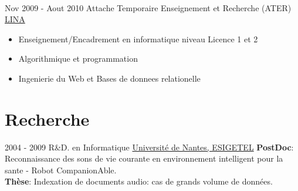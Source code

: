 \documentclass[letterpaper]{twentysecondcv} %
\begin{document}
\begin{twenty}
       \\
	\twentyitem
	{Nov 2009 -}
	{Aout 2010}
	{Attache Temporaire Enseignement et Recherche (ATER)}
	{\href{http://www.lina.univ-nantes.fr/}{LINA}}
	{}
	{
		\begin{itemize}
			\item Enseignement/Encadrement en informatique niveau Licence 1 et 2
			\item Algorithmique et programmation
			\item Ingenierie du Web et Bases de donnees relationelle
		\end{itemize}
	}
\end{twenty}

\section{Recherche}
\begin{twenty}
	\twentyitem
    	{2004 - 2009}
		{}
        {R\&D. en Informatique}
        {\href{https://www.univ-nantes.fr/}{Université de Nantes, ESIGETEL}}
        {}
	       {
	        \textbf{PostDoc}: Reconnaissance des sons de vie courante en environnement intelligent pour la sante - Robot CompanionAble. \\
	       	\textbf{Thèse}: Indexation de documents audio: cas de grands volume de données.
	        {
			}
	       }
  
\end{twenty}

\end{document}
